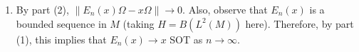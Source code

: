 \documentclass[a4paper,10pt]{report}
\begin{document}
\begin{enumerate}
\begin{enumerate}
			\item By part (2), $\|E_n(x)\Omega - x\Omega\| \rightarrow 0$.  Also, observe that $E_n(x)$ is a bounded sequence in $M$ (taking $H = B(L^2(M))$ here).
				Therefore, by part (1), this implies that $E_n(x) \rightarrow x$ SOT as $n\rightarrow \infty$.
		\end{enumerate}
\end{enumerate}
\end{document}
